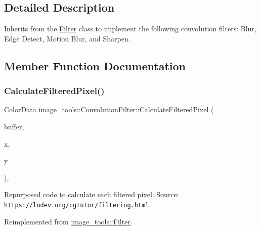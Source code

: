 \subsection{Detailed Description}
Inherits from the \hyperlink{classimage__tools_1_1Filter}{Filter} class to implement the following convolution filters\+: Blur, Edge Detect, Motion Blur, and Sharpen. 

\subsection{Member Function Documentation}
\mbox{\label{classimage__tools_1_1ConvolutionFilter_a2d35a2e2a2d1303d0a6824b16406d97b}} 
\subsubsection{\texorpdfstring{Calculate\+Filtered\+Pixel()}{CalculateFilteredPixel()}}
{\footnotesize\ttfamily \hyperlink{classimage__tools_1_1ColorData}{Color\+Data} image\+\_\+tools\+::\+Convolution\+Filter\+::\+Calculate\+Filtered\+Pixel (\begin{DoxyParamCaption}\item[{\hyperlink{classimage__tools_1_1PixelBuffer}{Pixel\+Buffer} $\ast$}]{buffer,  }\item[{int}]{x,  }\item[{int}]{y }\end{DoxyParamCaption})\hspace{0.3cm}{\ttfamily [override]}, {\ttfamily [virtual]}}

Repurposed code to calculate each filtered pixel. Source\+: \href{https://lodev.org/cgtutor/filtering.html}{\tt https\+://lodev.\+org/cgtutor/filtering.\+html}. 

Reimplemented from \hyperlink{classimage__tools_1_1Filter_a68d38fa12b87e20b81090cb380c0a307}{image\+\_\+tools\+::\+Filter}.

\mbox{\label{classimage__tools_1_1ConvolutionFilter_aef03779d74d96173880d93d06c7bd6b6}} 
